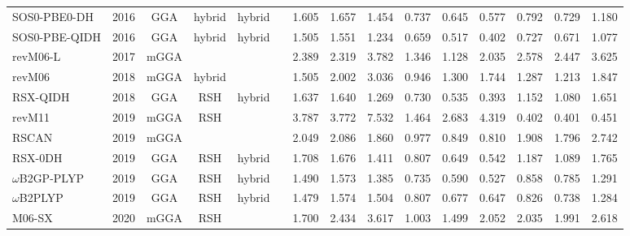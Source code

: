 \begin{landscape}
\begin{longtable}{ll:cccc:rrr:rrr:rrr}
    SOS0-PBE0-DH     & 2016 & GGA  & hybrid   & hybrid      &           & 1.605             & 1.657             & 1.454  & 0.737              & 0.645             & 0.577  & 0.792   & 0.729 & 1.180 \\
    SOS0-PBE-QIDH    & 2016 & GGA  & hybrid   & hybrid      &           & 1.505             & 1.551             & 1.234  & 0.659              & 0.517             & 0.402  & 0.727   & 0.671 & 1.077 \\
    revM06-L         & 2017 & mGGA &          &             &           & 2.389             & 2.319             & 3.782  & 1.346              & 1.128             & 2.035  & 2.578   & 2.447 & 3.625 \\
    revM06           & 2018 & mGGA & hybrid   &             &           & 1.505             & 2.002             & 3.036  & 0.946              & 1.300             & 1.744  & 1.287   & 1.213 & 1.847 \\
    RSX-QIDH         & 2018 & GGA  & RSH      & hybrid      &           & 1.637             & 1.640             & 1.269  & 0.730              & 0.535             & 0.393  & 1.152   & 1.080 & 1.651 \\
    revM11           & 2019 & mGGA & RSH      &             &           & 3.787             & 3.772             & 7.532  & 1.464              & 2.683             & 4.319  & 0.402   & 0.401 & 0.451 \\
    RSCAN            & 2019 & mGGA &          &             &           & 2.049             & 2.086             & 1.860  & 0.977              & 0.849             & 0.810  & 1.908   & 1.796 & 2.742 \\
    RSX-0DH          & 2019 & GGA  & RSH      & hybrid      &           & 1.708             & 1.676             & 1.411  & 0.807              & 0.649             & 0.542  & 1.187   & 1.089 & 1.765 \\
    $\omega$B2GP-PLYP       & 2019 & GGA  & RSH      & hybrid      &           & 1.490             & 1.573             & 1.385  & 0.735              & 0.590             & 0.527  & 0.858   & 0.785 & 1.291 \\
    $\omega$B2PLYP          & 2019 & GGA  & RSH      & hybrid      &           & 1.479             & 1.574             & 1.504  & 0.807              & 0.677             & 0.647  & 0.826   & 0.738 & 1.284 \\
    M06-SX           & 2020 & mGGA & RSH      &             &           & 1.700             & 2.434             & 3.617  & 1.003              & 1.499             & 2.052  & 2.035   & 1.991 & 2.618 \\

\end{longtable}
\end{landscape}
